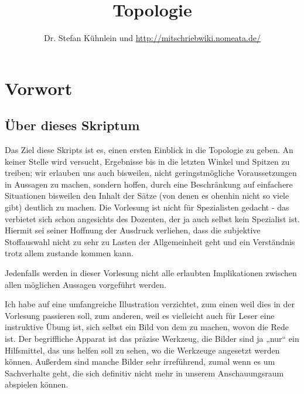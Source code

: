 \documentclass[12pt]{scrbook}   %
\author{Dr. Stefan Kühnlein und \url{http://mitschriebwiki.nomeata.de/}}
\title{Topologie}
\begin{document}
\maketitle

\renewcommand\theHchapter{\arabic{chapter}}
\tableofcontents


\chapter{Vorwort}

\section*{Über dieses Skriptum}

Das Ziel diese Skripts ist es, einen ersten Einblick in die Topologie zu geben.
An keiner Stelle wird versucht, Ergebnisse bis in die letzten Winkel und 
Spitzen zu treiben; wir erlauben uns auch bisweilen, nicht geringstmögliche 
Voraussetzungen in Aussagen zu machen, sondern hoffen, durch eine 
Beschränkung auf einfachere Situationen bisweilen den Inhalt der Sätze
(von denen es ohenhin nicht so viele gibt) deutlich zu machen. Die Vorlesung
ist nicht für Spezialisten gedacht - das verbietet sich schon angesichts des
Dozenten, der ja auch selbst kein Spezialist ist. Hiermit sei seiner Hoffnung 
der Ausdruck verliehen, dass die subjektive Stoffauswahl nicht zu sehr zu 
Lasten der Allgemeinheit geht und ein Verständnis trotz allem zustande
kommen kann.

Jedenfalls werden in dieser Vorlesung nicht alle erlaubten Implikationen 
zwischen allen möglichen Aussagen vorgeführt werden. 

Ich habe auf eine umfangreiche Illustration verzichtet, zum einen weil dies in 
der Vorlesung passieren soll, zum 
anderen, weil es vielleicht auch für Leser eine instruktive Übung ist, sich
selbst ein Bild von dem zu machen, wovon die Rede ist. Der begriffliche 
Apparat ist das präzise Werkzeug, die Bilder sind ja „nur“ ein 
Hilfsmittel, das uns helfen soll zu sehen, wo die Werkzeuge angesetzt werden 
können. Außerdem sind manche Bilder sehr irreführend, zumal wenn es um
Sachverhalte geht, die sich definitiv nicht mehr in unserem Anschauungsraum
abspielen können.
\end{document}
